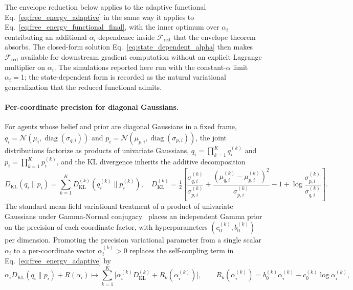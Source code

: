 \documentclass[11pt]{article}
\begin{document}
The envelope reduction below applies to the adaptive functional Eq.~\eqref{eq:free_energy_adaptive} in the same way it applies to Eq.~\eqref{eq:free_energy_functional_final}, with the inner optimum over $\alpha_i$ contributing an additional $\alpha_i$-dependence inside $\mathcal{F}_{\mathrm{red}}$ that the envelope theorem absorbs. The closed-form solution Eq.~\eqref{eq:state_dependent_alpha} then makes $\mathcal{F}_{\mathrm{red}}$ available for downstream gradient computation without an explicit Lagrange multiplier on $\alpha_i$. The simulations reported here run with the constant-$\alpha$ limit $\alpha_i = 1$; the state-dependent form is recorded as the natural variational generalization that the reduced functional admits.

\paragraph{Per-coordinate precision for diagonal Gaussians.}
\label{par:per_coord_alpha}
For agents whose belief and prior are diagonal Gaussians in a fixed frame, $q_i = \mathcal{N}(\mu_i, \operatorname{diag}(\sigma_{q,i}))$ and $p_i = \mathcal{N}(\mu_{p,i}, \operatorname{diag}(\sigma_{p,i}))$, the joint distributions factorize as products of univariate Gaussians, $q_i = \prod_{k=1}^{K} q_i^{(k)}$ and $p_i = \prod_{k=1}^{K} p_i^{(k)}$, and the KL divergence inherits the additive decomposition
\begin{equation}
D_{\mathrm{KL}}(q_i \| p_i) = \sum_{k=1}^{K} D_{\mathrm{KL}}^{(k)}(q_i^{(k)} \| p_i^{(k)}),
\quad
D_{\mathrm{KL}}^{(k)} = \tfrac{1}{2}\left[ \frac{\sigma_{q,i}^{(k)}}{\sigma_{p,i}^{(k)}} + \frac{(\mu_{q,i}^{(k)} - \mu_{p,i}^{(k)})^2}{\sigma_{p,i}^{(k)}} - 1 + \log \frac{\sigma_{p,i}^{(k)}}{\sigma_{q,i}^{(k)}} \right].
\label{eq:kl_decomposition_per_coord}
\end{equation}
The standard mean-field variational treatment of a product of univariate Gaussians under Gamma-Normal conjugacy~\cite[\S 10.2]{Bishop2006} places an independent Gamma prior on the precision of each coordinate factor, with hyperparameters $(c_0^{(k)}, b_0^{(k)})$ per dimension. Promoting the precision variational parameter from a single scalar $\alpha_i$ to a per-coordinate vector $\alpha_i^{(k)} > 0$ replaces the self-coupling term in Eq.~\eqref{eq:free_energy_adaptive} by
\begin{equation}
\alpha_i  D_{\mathrm{KL}}(q_i \| p_i) + R(\alpha_i)
\longmapsto
\sum_{k=1}^{K} \Big[\alpha_i^{(k)} D_{\mathrm{KL}}^{(k)} + R_k(\alpha_i^{(k)})\Big],
\qquad
R_k(\alpha_i^{(k)}) = b_0^{(k)} \alpha_i^{(k)} - c_0^{(k)} \log \alpha_i^{(k)},
\label{eq:adaptive_self_coupling_per_coord}
\end{equation}
\end{document}
